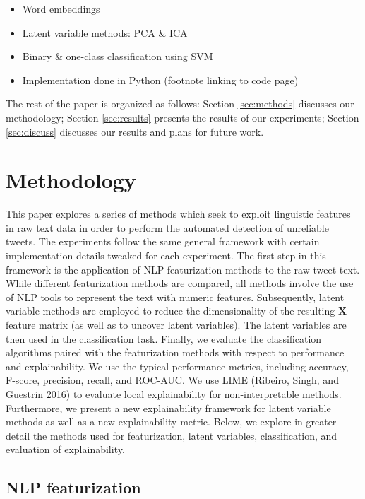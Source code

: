 \documentclass{article}
\begin{document}
\begin{itemize}
\tightlist
\item
  Word embeddings
\item
  Latent variable methods: PCA \& ICA
\item
  Binary \& one-class classification using SVM
\item
  Implementation done in Python (footnote linking to code page)
\end{itemize}

The rest of the paper is organized as follows: Section \ref{sec:methods}
discusses our methodology; Section \ref{sec:results} presents the
results of our experiments; Section \ref{sec:discuss} discusses our
results and plans for future work.

\hypertarget{methodology}{%
\section{Methodology}\label{methodology}}

\label{sec:methods} This paper explores a series of methods which seek
to exploit linguistic features in raw text data in order to perform the
automated detection of unreliable tweets. The experiments follow the
same general framework with certain implementation details tweaked for
each experiment. The first step in this framework is the application of
NLP featurization methods to the raw tweet text. While different
featurization methods are compared, all methods involve the use of NLP
tools to represent the text with numeric features. Subsequently, latent
variable methods are employed to reduce the dimensionality of the
resulting \(\mathbf{X}\) feature matrix (as well as to uncover latent
variables). The latent variables are then used in the classification
task. Finally, we evaluate the classification algorithms paired with the
featurization methods with respect to performance and explainability. We
use the typical performance metrics, including accuracy, F-score,
precision, recall, and ROC-AUC. We use LIME (Ribeiro, Singh, and
Guestrin 2016) to evaluate local explainability for non-interpretable
methods. Furthermore, we present a new explainability framework for
latent variable methods as well as a new explainability metric. Below,
we explore in greater detail the methods used for featurization, latent
variables, classification, and evaluation of explainability.

\hypertarget{nlp-featurization}{%
\subsection{NLP featurization}\label{nlp-featurization}}
\end{document}
